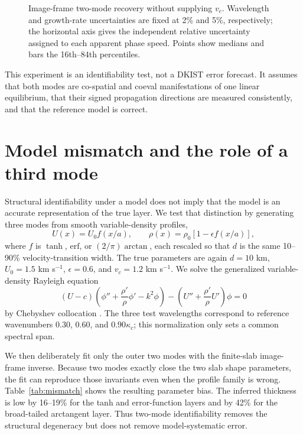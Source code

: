 \documentclass[linenumbers]{aastex7}
\begin{document}
\begin{figure}
\caption{Image-frame two-mode recovery without supplying $v_c$. Wavelength and growth-rate uncertainties are fixed at 2\% and 5\%, respectively; the horizontal axis gives the independent relative uncertainty assigned to each apparent phase speed. Points show medians and bars the 16th--84th percentiles.}
\label{fig:image-recovery}
\end{figure}

This experiment is an identifiability test, not a DKIST error forecast. It assumes that both modes are co-spatial and coeval manifestations of one linear equilibrium, that their signed propagation directions are measured consistently, and that the reference model is correct.

\section{Model mismatch and the role of a third mode}
Structural identifiability under a model does not imply that the model is an accurate representation of the true layer. We test that distinction by generating three modes from smooth variable-density profiles,
\begin{equation}
U(x)=U_0 f(x/a),\qquad \rho(x)=\rho_0[1-\epsilon f(x/a)],
\end{equation}
where $f$ is $\tanh$, $\mathrm{erf}$, or $(2/\pi)\arctan$, each rescaled so that $d$ is the same 10--90\% velocity-transition width. The true parameters are again $d=10$ km, $U_0=1.5$ km s$^{-1}$, $\epsilon=0.6$, and $v_c=1.2$ km s$^{-1}$. We solve the generalized variable-density Rayleigh equation
\begin{equation}
(U-c)\left(\phi''+\frac{\rho'}{\rho}\phi'-k^2\phi\right)
-\left(U''+\frac{\rho'}{\rho}U'\right)\phi=0
\end{equation}
by Chebyshev collocation \citep{Charru2011}. The three test wavelengths correspond to reference wavenumbers $0.30$, $0.60$, and $0.90\kappa_c$; this normalization only sets a common spectral span.

We then deliberately fit only the outer two modes with the finite-slab image-frame inverse. Because two modes exactly close the two slab shape parameters, the fit can reproduce those invariants even when the profile family is wrong. Table~\ref{tab:mismatch} shows the resulting parameter bias. The inferred thickness is low by 16--19\% for the tanh and error-function layers and by 42\% for the broad-tailed arctangent layer. Thus two-mode identifiability removes the structural degeneracy but does not remove model-systematic error.
\end{document}
